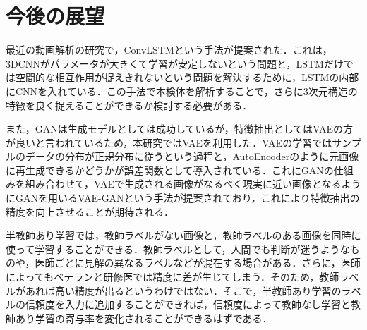 \section{今後の展望}
最近の動画解析の研究で，ConvLSTMという手法が提案された\cite{xingjian2015convolutional}．これは，3DCNNがパラメータが大きくて学習が安定しないという問題と，LSTMだけでは空間的な相互作用が捉えきれないという問題を解決するために，LSTMの内部にCNNを入れている．この手法で本検体を解析することで，さらに3次元構造の特徴を良く捉えることができるか検討する必要がある．

また，GANは生成モデルとしては成功しているが，特徴抽出としてはVAEの方が良いと言われているため，本研究ではVAEを利用した．VAEの学習ではサンプルのデータの分布が正規分布に従うという過程と，AutoEncoderのように元画像に再生成できるかどうかが誤差関数として導入されている．これにGANの仕組みを組み合わせて，VAEで生成される画像がなるべく現実に近い画像となるようにGANを用いるVAE-GANという手法が提案されており，これにより特徴抽出の精度を向上させることが期待される\cite{bao2017cvae}．

半教師あり学習では，教師ラベルがない画像と，教師ラベルのある画像を同時に使って学習することができる．教師ラベルとして，人間でも判断が迷うようなものや，医師ごとに見解の異なるラベルなどが混在する場合がある．さらに，医師によってもベテランと研修医では精度に差が生じてしまう．そのため，教師ラベルがあれば高い精度が出るというわけではない．そこで，半教師あり学習のラベルの信頼度を入力に追加することができれば，信頼度によって教師なし学習と教師あり学習の寄与率を変化されることができるはずである．